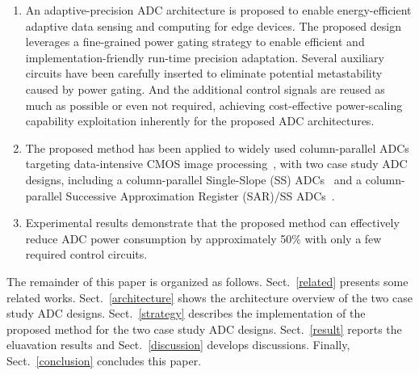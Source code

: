 \begin{enumerate}[\IEEEsetlabelwidth{3)}]
	\item 
	An adaptive-precision ADC architecture is proposed to enable energy-efficient adaptive data sensing and computing for edge devices. The proposed design leverages a fine-grained power gating strategy to enable efficient and implementation-friendly run-time precision adaptation.
	Several auxiliary circuits have been carefully inserted to eliminate potential metastability caused by power gating. And the additional control signals are reused as much as possible or even not required, achieving cost-effective power-scaling capability exploitation inherently for the proposed ADC architectures.
	\item 
	The proposed method has been applied to widely used column-parallel ADCs targeting data-intensive CMOS image processing~\cite{kim_11-bit_2021,nie_single_2020,kumagai_14-inch_2018,park_640_2020}, with two case study ADC designs, including 
	a column-parallel Single-Slope (SS) ADCs~\cite{snoeij_18v_2005,kleinfelder_10000_2001} and a column-parallel Successive Approximation Register (SAR)/SS ADCs~\cite{kim_area-efficient_2016}. 


	\item 
	Experimental results demonstrate that the proposed method can effectively reduce ADC power consumption by approximately 50\% with only a few required control circuits.

\end{enumerate} 

The remainder of this paper is organized as follows. 
Sect.~\ref{related} presents some related works.
Sect.~\ref{architecture} shows the architecture overview of the two case study ADC designs. 
Sect.~\ref{strategy} describes the implementation of the proposed method for the two case study ADC designs. 
Sect.~\ref{result} reports the eluavation results and Sect.~\ref{discussion} develops discussions. 
Finally, Sect.~\ref{conclusion} concludes this paper.
